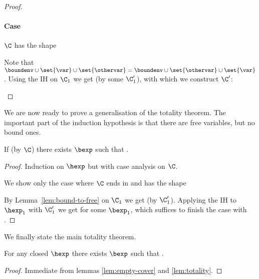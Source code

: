 \begin{proof}
\paragraph{Case \textnormal{}}
$\C$ has the shape
\begin{prooftree}
\end{prooftree}
Note that $\boundenv \cup \set{\var} \cup \set{\othervar} = \boundenv \cup \set{\othervar} \cup \set{\var}$.
Using the IH on $\C_1$ we get  (by some $\C_1'$), with which we construct $\C'$:
\begin{prooftree}
\end{prooftree}

\end{proof}

We are now ready to prove a generalisation of the totality theorem.
The important part of the induction hypothesis is that there are free variables, but no bound ones.

\begin{lemma}
\label{lem:totality}
If \cover{\emptyset}{\benvext}{\hexp} (by $\C$) there exists $\bexp$ such that \trahb{}{\benvext}{\bexp}{\hexp}.
\end{lemma}


\begin{proof}
Induction on $\hexp$ but with case analysis on $\C$.

We show only the case where $\C$ ends in  and has the shape
\begin{prooftree}
\end{prooftree}
By Lemma~\ref{lem:bound-to-free} on $\C_1$ we get  (by $\C_1'$).
Applying the IH to $\hexp_1$ with $\C_1'$ we get  for some $\bexp_1$, which suffices to finish the case with .

\end{proof}

We finally state the main totality theorem.

\begin{theorem}
For any closed $\hexp$ there exists $\bexp$ such that \trahb{}{\envnil}{\bexp}{\hexp}.
\end{theorem}


\begin{proof}
Immediate from lemmas \ref{lem:empty-cover} and \ref{lem:totality}.
\end{proof}
